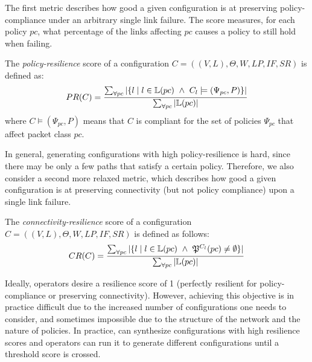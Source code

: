 The first metric describes how good a given configuration
is at preserving policy-compliance under an 
arbitrary single link failure. 
The score measures, for each policy $pc$, what percentage of the links affecting $pc$
causes a policy to still hold when failing.
\begin{definition}
The \emph{policy-resilience} score of a configuration 
$C=((V,L), \Theta,W,LP,IF,SR)$
is defined as:
\[
PR(C)=\frac{\sum_{\forall pc} |\{ l \mid l \in \mathbb{L}(pc) ~\wedge~ C_l \models (\Psi_{pc}, P) \}|}
{\sum_{\forall pc} |\mathbb{L}(pc)|}
\]
where $C \models (\Psi_{pc}, P)$ means that $C$ is 
compliant for the set of policies $\Psi_{pc}$ that affect packet class $pc$.
\end{definition}

In general, generating configurations with high policy-resilience is hard,
since there may be only a few paths that satisfy a certain policy.
Therefore, we also consider a second 
more relaxed metric, which describes how 
good a given configuration
is at preserving connectivity
(but not policy compliance) upon a single link failure. 
\begin{definition}
The \emph{connectivity-resilience} 
score of a configuration $C=((V,L), \Theta,W,LP,IF,SR)$
is defined as follows:
\[
CR(C)=\frac{\sum_{\forall pc} |\{ l \mid l \in \mathbb{L}(pc) ~\wedge~\mathfrak{P}^{C_l }(pc) \not= \emptyset  \}|}
{\sum_{\forall pc} |\mathbb{L}(pc)|}
\]
\end{definition}
 
Ideally, operators desire a resilience score of 1 (perfectly resilient for policy-compliance or
preserving connectivity). However, achieving this objective is in practice difficult  
due to the 
increased number of configurations one needs to consider,
and sometimes impossible due to the structure of the network and the nature of policies.
In practice, \name can synthesize configurations 
with high resilience scores and operators can run it to generate different configurations until
a threshold score is crossed. 


